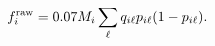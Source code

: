 \par\needspace{70pt}\begin{minipage}{\linewidth}
\begin{equation}f_i^{\rm raw}=0.07M_i\sum_{\ell}q_{i\ell}p_{i\ell}(1-p_{i\ell}).\label{eq:7}\end{equation}
\end{minipage}\par
